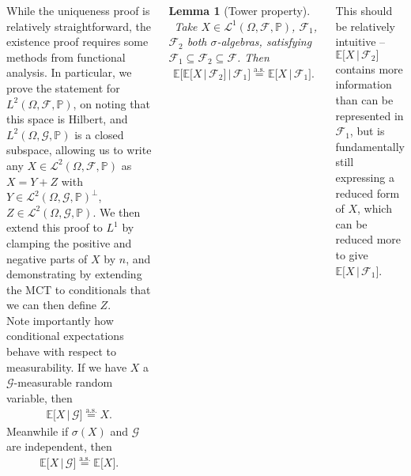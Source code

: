 \documentclass{tikzposter} %
\newtheorem{lemma}[theorem]{Lemma}
\begin{document}
\begin{columns}
{    While the uniqueness proof is relatively straightforward, the existence proof requires some methods from functional analysis. In particular, we prove the statement for $L^{2}(\Omega, \mathcal{F}, \mathbb{P})$, on noting that this space is Hilbert, and $L^{2}(\Omega, \mathcal{G}, \mathbb{P})$ is a closed subspace, allowing us to write any $X \in \mathcal{L}^{2}(\Omega, \mathcal{F}, \mathbb{P})$ as $X = Y + Z$ with $Y \in \mathcal{L}^{2}(\Omega, \mathcal{G}, \mathbb{P})^{\perp}$, $Z \in \mathcal{L}^{2}(\Omega, \mathcal{G},\mathbb{P})$. We then extend this proof to $L^{1}$ by clamping the positive and negative parts of $X$ by $n$, and demonstrating by extending the MCT to conditionals that we can then define $Z$. \\

    Note importantly how conditional expectations behave with respect to measurability. If we have $X$ a $\mathcal{G}$-measurable random variable, then
    \begin{align*}
      \mathbb{E}\big[X \,|\, \mathcal{G}\big] \overset{\mathrm{a.s.}}{=} X.
    \end{align*}
    Meanwhile if $\sigma(X)$ and $\mathcal{G}$ are independent, then
    \begin{align*}
      \mathbb{E}\big[X \,|\, \mathcal{G}\big] \overset{\mathrm{a.s.}}{=} \mathbb{E}\big[X\big].
    \end{align*}
    \hphantom{}

    \begin{lemma}[Tower property]
      \ Take $X \in \mathcal{L}^{1}(\Omega, \mathcal{F}, \mathbb{P})$, $\mathcal{F}_{1}$, $\mathcal{F}_{2}$ both $\sigma$-algebras, satisfying $\mathcal{F}_{1} \subseteq \mathcal{F}_{2} \subseteq \mathcal{F}$. Then
      \begin{align*}
        \mathbb{E}\Big[\mathbb{E}\big[X \,|\, \mathcal{F}_{2}\big] \,|\, \mathcal{F}_{1}\Big] \overset{\mathrm{a.s.}}{=} \mathbb{E}\big[X \,|\, \mathcal{F}_{1}\big].
      \end{align*}
    \end{lemma}

    This should be relatively intuitive -- $\mathbb{E}\big[X \,|\, \mathcal{F}_{2}\big]$ contains more information than can be represented in $\mathcal{F}_{1}$, but is fundamentally still expressing a reduced form of $X$, which can be reduced more to give $\mathbb{E}\big[X \,|\, \mathcal{F}_{1}\big]$. \\

}
\end{columns}
\end{document}

